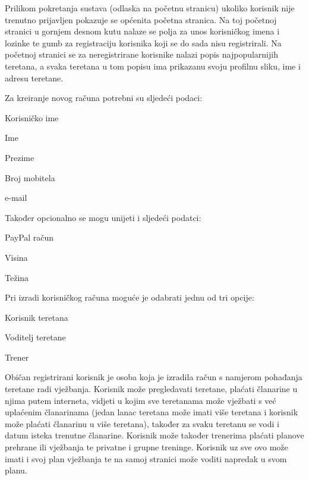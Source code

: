 		Prilikom pokretanja sustava (odlaska na početnu stranicu) ukoliko korisnik nije trenutno prijavljen pokazuje se općenita početna stranica. Na toj početnoj stranici u gornjem desnom kutu nalaze se polja za unos korisničkog imena i lozinke te gumb za registraciju korisnika koji se do sada nisu registrirali. Na početnoj stranici se za neregistrirane korisnike nalazi popis najpopularnijih teretana, a svaka teretana u tom popisu ima prikazanu svoju profilnu sliku, ime i adresu teretane.
		
		Za kreiranje novog računa potrebni su sljedeći podaci:

		\begin{packed_item}
			\item Korisničko ime
			\item Ime
			\item Prezime
			\item Broj mobitela
			\item e-mail
		\end{packed_item}
	
		Također opcionalno se mogu unijeti i sljedeći podatci:
		
		\begin{packed_item}
			\item PayPal račun
			\item Visina
			\item Težina
		\end{packed_item}
	
		Pri izradi korisničkog računa moguće je odabrati jednu od tri opcije:
		
		\begin{packed_item}
			\item Korisnik teretana
			\item Voditelj teretane
			\item Trener
		\end{packed_item}
	
		Običan registrirani korisnik je osoba koja je izradila račun s namjerom pohađanja teretane radi vježbanja.
		Korisnik može pregledavati teretane, plaćati članarine u njima putem interneta, vidjeti u kojim sve teretanama
		može vježbati s već uplaćenim članarinama (jedan lanac teretana može imati više teretana i korisnik može
		plaćati članarinu u više teretana), također za svaku teretanu se vodi i datum isteka trenutne članarine. Korisnik
		može također trenerima plaćati planove prehrane ili vježbanja te privatne i grupne treninge. Korisnik uz sve
		ovo može imati i svoj plan vježbanja te na samoj stranici može voditi napredak u svom planu.
	
